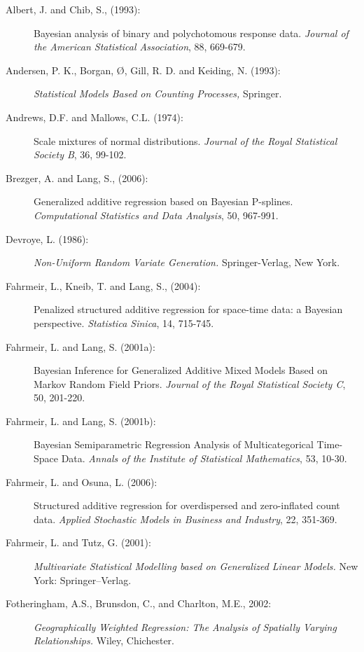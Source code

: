 \documentclass[11pt,a4paper,twoside]{bayesxarticle}
\begin{document}
\begin{description}
\item[Albert, J. and Chib, S., (1993):]
Bayesian analysis of binary and polychotomous response data. {\it
Journal of the American Statistical Association},  88, 669-679.

\item[Andersen, P. K., Borgan, {\O}, Gill, R. D. and Keiding, N. (1993):]
{\it Statistical Models Based on Counting Processes,} Springer.

\item[Andrews, D.F. and Mallows, C.L. (1974):]
Scale mixtures of normal distributions. {\it Journal of the Royal
Statistical Society B}, 36, 99-102.

\item[Brezger, A. and Lang, S., (2006):]
Generalized additive regression based on Bayesian P-splines. {\it
Computational Statistics and Data Analysis}, 50, 967-991.

\item[Devroye, L. (1986):]
{\it Non-Uniform Random Variate Generation.} Springer-Verlag, New
York.

\item[Fahrmeir, L., Kneib, T. and Lang, S., (2004):] Penalized
structured additive regression for space-time data: a Bayesian
perspective. {\em Statistica Sinica}, 14, 715-745.

\item[Fahrmeir, L. and Lang, S. (2001a):] Bayesian Inference for
Generalized Additive Mixed Models Based on Markov Random Field
Priors. {\em Journal of the Royal Statistical Society C}, 50,
201-220.

\item[Fahrmeir, L. and Lang, S. (2001b):] Bayesian Semiparametric Regression Analysis of Multicategorical
Time-Space Data. {\em Annals of the  Institute of Statistical
Mathematics}, 53, 10-30.

\item[Fahrmeir, L. and Osuna, L. (2006):] Structured additive regression for
overdispersed and zero-inflated count data. {\em Applied Stochastic
Models in Business and Industry}, 22, 351-369.

\item[Fahrmeir, L. and Tutz, G. (2001):] {\em Multivariate Statistical
Modelling based on Generalized Linear Models.} New York:
Springer--Verlag.

\item[Fotheringham, A.S., Brunsdon, C., and Charlton, M.E., 2002:]
{\it Geographically Weighted Regression: The Analysis of Spatially
Varying Relationships.} Wiley, Chichester.


\end{description}
\end{document}
